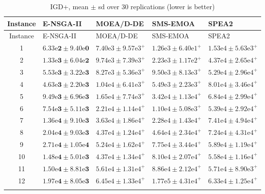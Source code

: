\documentclass[11pt, a4paper]{article}
\begin{document}
\hypertarget{tab:IGD}{}
\begin{longtable}[!htb]{@{}cllll@{}}
\caption{IGD+, mean $\pm$ sd over 30 replications (lower is better)}\tabularnewline
\toprule
Instance & E-NSGA-II & MOEA/D-DE & SMS-EMOA & SPEA2\tabularnewline
\midrule
\endfirsthead
\toprule
Instance & E-NSGA-II & MOEA/D-DE & SMS-EMOA & SPEA2\tabularnewline
\midrule
\endhead
1 & $\mathbf{6.33\mathrm{e}2 \pm 9.40\mathrm{e}0}$ & $7.40\mathrm{e}3 \pm 9.57\mathrm{e}3^+$ & $1.26\mathrm{e}3 \pm 6.40\mathrm{e}1^+$ & $1.53\mathrm{e}4 \pm 5.63\mathrm{e}3^+$\tabularnewline

2 & $\mathbf{1.33\mathrm{e}3 \pm 6.04\mathrm{e}2}$ & $9.74\mathrm{e}3 \pm 7.39\mathrm{e}3^+$ & $2.23\mathrm{e}3 \pm 1.17\mathrm{e}2^+$ & $4.37\mathrm{e}4 \pm 2.65\mathrm{e}4^+$\tabularnewline

3 & $\mathbf{5.53\mathrm{e}3 \pm 3.22\mathrm{e}3}$ & $8.27\mathrm{e}3 \pm 5.36\mathrm{e}3^+$ & $9.50\mathrm{e}3 \pm 8.13\mathrm{e}3^+$ & $5.29\mathrm{e}4 \pm 2.96\mathrm{e}4^+$\tabularnewline

4 & $\mathbf{4.63\mathrm{e}3 \pm 2.20\mathrm{e}3}$ & $1.04\mathrm{e}4 \pm 6.41\mathrm{e}3^+$ & $5.49\mathrm{e}3 \pm 2.23\mathrm{e}3^+$ & $8.01\mathrm{e}4 \pm 3.46\mathrm{e}4^+$\tabularnewline

5 & $\mathbf{9.49\mathrm{e}3 \pm 6.96\mathrm{e}3}$ & $1.65\mathrm{e}4 \pm 7.74\mathrm{e}3^+$ & $3.42\mathrm{e}4 \pm 1.13\mathrm{e}4^+$ & $6.84\mathrm{e}4 \pm 2.99\mathrm{e}4^+$\tabularnewline

6 & $\mathbf{7.54\mathrm{e}3 \pm 5.11\mathrm{e}3}$ & $2.21\mathrm{e}4 \pm 1.14\mathrm{e}4^+$ & $1.10\mathrm{e}4 \pm 5.08\mathrm{e}3^+$ & $5.39\mathrm{e}4 \pm 2.92\mathrm{e}4^+$\tabularnewline

7 & $\mathbf{1.36\mathrm{e}4 \pm 9.10\mathrm{e}3}$ & $3.63\mathrm{e}4 \pm 1.86\mathrm{e}4^+$ & $2.28\mathrm{e}4 \pm 1.43\mathrm{e}4^+$ & $7.41\mathrm{e}4 \pm 4.94\mathrm{e}4^+$\tabularnewline

8 & $\mathbf{2.04\mathrm{e}4 \pm 9.03\mathrm{e}3}$ & $4.37\mathrm{e}4 \pm 1.24\mathrm{e}4^+$ & $4.64\mathrm{e}4 \pm 2.34\mathrm{e}4^+$ & $7.24\mathrm{e}4 \pm 4.31\mathrm{e}4^+$\tabularnewline

9 & $\mathbf{2.71\mathrm{e}4 \pm 1.05\mathrm{e}4}$ & $5.24\mathrm{e}4 \pm 1.62\mathrm{e}4^+$ & $7.75\mathrm{e}4 \pm 3.44\mathrm{e}4^+$ & $5.89\mathrm{e}4 \pm 1.19\mathrm{e}4^+$\tabularnewline

10 & $\mathbf{1.48\mathrm{e}4 \pm 5.01\mathrm{e}3}$ & $4.37\mathrm{e}4 \pm 1.34\mathrm{e}4^+$ & $8.10\mathrm{e}4 \pm 2.07\mathrm{e}4^+$ & $5.58\mathrm{e}4 \pm 1.16\mathrm{e}4^+$\tabularnewline

11 & $\mathbf{1.50\mathrm{e}4 \pm 8.81\mathrm{e}3}$ & $5.61\mathrm{e}4 \pm 1.31\mathrm{e}4^+$ & $8.86\mathrm{e}4 \pm 2.12\mathrm{e}4^+$ & $5.71\mathrm{e}4 \pm 8.90\mathrm{e}3^+$\tabularnewline

12 & $\mathbf{1.97\mathrm{e}4 \pm 8.05\mathrm{e}3}$ & $6.45\mathrm{e}4 \pm 1.33\mathrm{e}4^+$ & $1.77\mathrm{e}5 \pm 4.31\mathrm{e}4^+$ & $6.33\mathrm{e}4 \pm 1.25\mathrm{e}4^+$\tabularnewline
\bottomrule
\label{tab:IGD}
\end{longtable}
\protect\hypertarget{tab:IGD}{}{}
\end{document}

